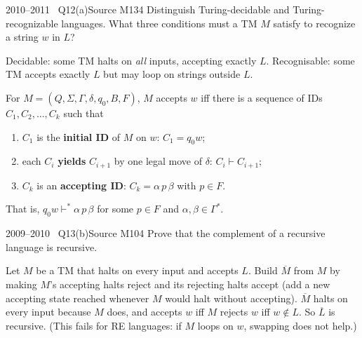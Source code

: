 \documentclass[11pt,a4paper]{article}
\begin{document}
\begin{question}{2010--2011 \textbullet\ Q12(a)}{Source M13}{4}
Distinguish Turing-decidable and Turing-recognizable languages. What three conditions must a TM $M$ satisfy to recognize a string $w$ in $L$?
\end{question}
\begin{solution}
Decidable: some TM halts on \emph{all} inputs, accepting exactly $L$. Recognisable: some TM accepts exactly $L$ but may loop on strings outside $L$.

For $M=(Q,\Sigma,\Gamma,\delta,q_0,B,F)$, $M$ accepts $w$ iff there is a sequence of IDs $C_1,C_2,\dots,C_k$ such that
\begin{enumerate}
\item $C_1$ is the \textbf{initial ID} of $M$ on $w$: $C_1=q_0w$;
\item each $C_i$ \textbf{yields} $C_{i+1}$ by one legal move of $\delta$: $C_i\vdash C_{i+1}$;
\item $C_k$ is an \textbf{accepting ID}: $C_k=\alpha\,p\,\beta$ with $p\in F$.
\end{enumerate}
That is, $q_0w\vdash^*\alpha\,p\,\beta$ for some $p\in F$ and $\alpha,\beta\in\Gamma^*$.
\end{solution}

\begin{question}{2009--2010 \textbullet\ Q13(b)}{Source M10}{4}
Prove that the complement of a recursive language is recursive.
\end{question}
\begin{solution}
Let $M$ be a TM that halts on every input and accepts $L$. Build $\overline M$ from $M$ by making $M$'s accepting halts reject and its rejecting halts accept (add a new accepting state reached whenever $M$ would halt without accepting). $\overline M$ halts on every input because $M$ does, and accepts $w$ iff $M$ rejects $w$ iff $w\notin L$. So $\overline L$ is recursive. (This fails for RE languages: if $M$ loops on $w$, swapping does not help.)
\end{solution}
\end{document}
